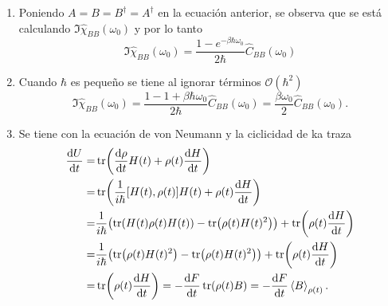 \documentclass{article}
\begin{document}
\begin{enumerate}
\item Poniendo $A=B=B^\dagger=A^\dagger$ en la ecuación anterior, se observa que se está calculando $\Im\hat{\chi}_{BB}(\omega_0)$ y por lo tanto
\begin{equation}\label{ec:chi_C}
\Im\hat{\chi}_{BB}(\omega_0)=\frac{1-e^{-\beta\hbar\omega_0}}{2\hbar}\hat{C}_{BB}(\omega_0)
\end{equation}

\item Cuando $\hbar$ es pequeño se tiene al ignorar términos $\mathcal{O}(\hbar^2)$
\begin{equation}
\Im\hat{\chi}_{BB}(\omega_0)=\frac{1-1+\beta\hbar\omega_0}{2\hbar}\hat{C}_{BB}(\omega_0)=\frac{\beta\omega_0}{2}\hat{C}_{BB}(\omega_0).
\end{equation}

\item Se tiene con la ecuación de von Neumann y la ciclicidad de ka traza
\begin{align}
\begin{split}
\dv{U}{t} (t)=&\tr(\dv{\rho}{t} (t)H(t)+\rho(t)\dv{H}{t} (t))\\
=&\tr(\frac{1}{i\hbar}[H(t),\rho(t)]H(t)+\rho(t)\dv{H}{t} (t))\\
=&\frac{1}{i\hbar}\qty(\tr(H(t)\rho(t)H(t))-\tr(\rho(t)H(t)^2))+\tr(\rho(t)\dv{H}{t} (t))\\
=&\frac{1}{i\hbar}\qty(\tr(\rho(t)H(t)^2)-\tr(\rho(t)H(t)^2))+\tr(\rho(t)\dv{H}{t} (t))\\
=&\tr(\rho(t)\dv{H}{t} (t))=-\dv{F}{t}(t)\tr(\rho(t)B)=-\dv{F}{t}(t)\ev{B}_{\rho(t)}.
\end{split}
\end{align}


\end{enumerate}
\end{document}
